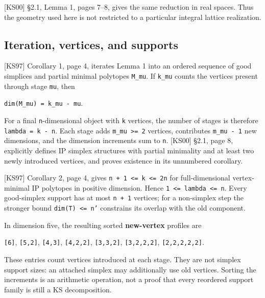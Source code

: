 \documentclass[11pt,a4paper,oneside]{report}
\begin{document}
{[}KS00{]} §2.1, Lemma 1, pages 7--8, gives the same reduction in real
spaces. Thus the geometry used here is not restricted to a particular
integral lattice realization.

\subsection{Iteration, vertices, and
supports}\label{minimal-ip-circuits-and-types--iteration-vertices-and-supports}

{[}KS97{]} Corollary 1, page 4, iterates Lemma 1 into an ordered
sequence of good simplices and partial minimal polytopes
\texttt{M\_\allowbreak{}mu}. If \texttt{k\_\allowbreak{}mu} counts the
vertices present through stage \texttt{mu}, then

\texttt{dim(\allowbreak{}M\_\allowbreak{}mu)\allowbreak{} =\allowbreak{} k\_\allowbreak{}mu -\allowbreak{} mu}.

For a final \texttt{n}-dimensional object with \texttt{k} vertices, the
number of stages is therefore
\texttt{lambda =\allowbreak{} k -\allowbreak{} n}. Each stage adds
\texttt{m\_\allowbreak{}mu >=\allowbreak{} 2} vertices, contributes
\texttt{m\_\allowbreak{}mu -\allowbreak{} 1} new dimensions, and the
dimension increments sum to \texttt{n}. {[}KS00{]} §2.1, page 8,
explicitly defines IP simplex structures with partial minimality and at
least two newly introduced vertices, and proves existence in its
unnumbered corollary.

{[}KS97{]} Corollary 2, page 4, gives
\texttt{n + 1 <=\allowbreak{} k <=\allowbreak{} 2n} for full-dimensional
vertex-minimal IP polytopes in positive dimension. Hence
\texttt{1 <=\allowbreak{} lambda <=\allowbreak{} n}. Every good-simplex
support has at most \texttt{n + 1} vertices; for a non-simplex step the
stronger bound
\texttt{dim(\allowbreak{}T)\allowbreak{} <=\allowbreak{} n'} constrains
its overlap with the old component.

In dimension five, the resulting sorted \textbf{new-vertex} profiles are

\texttt{[\allowbreak{}6]}, \texttt{[\allowbreak{}5,\allowbreak{}2]},
\texttt{[\allowbreak{}4,\allowbreak{}3]},
\texttt{[\allowbreak{}4,\allowbreak{}2,\allowbreak{}2]},
\texttt{[\allowbreak{}3,\allowbreak{}3,\allowbreak{}2]},
\texttt{[\allowbreak{}3,\allowbreak{}2,\allowbreak{}2,\allowbreak{}2]},
\texttt{[\allowbreak{}2,\allowbreak{}2,\allowbreak{}2,\allowbreak{}2,\allowbreak{}2]}.

These entries count vertices introduced at each stage. They are not
simplex support sizes: an attached simplex may additionally use old
vertices. Sorting the increments is an arithmetic operation, not a proof
that every reordered support family is still a KS decomposition.
\end{document}
